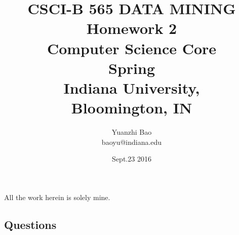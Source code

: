 \documentclass{article}
\begin{document}
	\title{ CSCI-B 565 DATA MINING \\
		Homework 2 \\
		Computer Science Core\\Spring\\Indiana University,\\ Bloomington, IN}
	\author{ Yuanzhi Bao \\ baoyu@indiana.edu}
	\date{Sept.23 2016 }
	\maketitle

\pagestyle{plain}
All the work herein is solely mine. \\ 




\subsection*{Questions}
\end{document}
